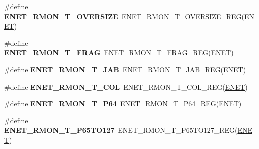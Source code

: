\begin{DoxyCompactItemize}
\item 
\#define {\bfseries E\+N\+E\+T\+\_\+\+R\+M\+O\+N\+\_\+\+T\+\_\+\+O\+V\+E\+R\+S\+I\+ZE}~E\+N\+E\+T\+\_\+\+R\+M\+O\+N\+\_\+\+T\+\_\+\+O\+V\+E\+R\+S\+I\+Z\+E\+\_\+\+R\+EG(\hyperlink{group__ENET__Peripheral__Access__Layer_ga4745105f505f3ab949d6a57fbe2a0ed5}{E\+N\+ET})\hypertarget{group__ENET__Register__Accessor__Macros_ga70b790437654820ef8d2fb4ccd56bac6}{}\label{group__ENET__Register__Accessor__Macros_ga70b790437654820ef8d2fb4ccd56bac6}

\item 
\#define {\bfseries E\+N\+E\+T\+\_\+\+R\+M\+O\+N\+\_\+\+T\+\_\+\+F\+R\+AG}~E\+N\+E\+T\+\_\+\+R\+M\+O\+N\+\_\+\+T\+\_\+\+F\+R\+A\+G\+\_\+\+R\+EG(\hyperlink{group__ENET__Peripheral__Access__Layer_ga4745105f505f3ab949d6a57fbe2a0ed5}{E\+N\+ET})\hypertarget{group__ENET__Register__Accessor__Macros_ga79c1cf9a47efaba14d5ab93b7e760702}{}\label{group__ENET__Register__Accessor__Macros_ga79c1cf9a47efaba14d5ab93b7e760702}

\item 
\#define {\bfseries E\+N\+E\+T\+\_\+\+R\+M\+O\+N\+\_\+\+T\+\_\+\+J\+AB}~E\+N\+E\+T\+\_\+\+R\+M\+O\+N\+\_\+\+T\+\_\+\+J\+A\+B\+\_\+\+R\+EG(\hyperlink{group__ENET__Peripheral__Access__Layer_ga4745105f505f3ab949d6a57fbe2a0ed5}{E\+N\+ET})\hypertarget{group__ENET__Register__Accessor__Macros_gab429b1b2658b8dc8f8900cc50243e7b2}{}\label{group__ENET__Register__Accessor__Macros_gab429b1b2658b8dc8f8900cc50243e7b2}

\item 
\#define {\bfseries E\+N\+E\+T\+\_\+\+R\+M\+O\+N\+\_\+\+T\+\_\+\+C\+OL}~E\+N\+E\+T\+\_\+\+R\+M\+O\+N\+\_\+\+T\+\_\+\+C\+O\+L\+\_\+\+R\+EG(\hyperlink{group__ENET__Peripheral__Access__Layer_ga4745105f505f3ab949d6a57fbe2a0ed5}{E\+N\+ET})\hypertarget{group__ENET__Register__Accessor__Macros_ga4e024726e7b145f433759bf4e343bead}{}\label{group__ENET__Register__Accessor__Macros_ga4e024726e7b145f433759bf4e343bead}

\item 
\#define {\bfseries E\+N\+E\+T\+\_\+\+R\+M\+O\+N\+\_\+\+T\+\_\+\+P64}~E\+N\+E\+T\+\_\+\+R\+M\+O\+N\+\_\+\+T\+\_\+\+P64\+\_\+\+R\+EG(\hyperlink{group__ENET__Peripheral__Access__Layer_ga4745105f505f3ab949d6a57fbe2a0ed5}{E\+N\+ET})\hypertarget{group__ENET__Register__Accessor__Macros_ga55f52465e75b039a863770db93c2fddd}{}\label{group__ENET__Register__Accessor__Macros_ga55f52465e75b039a863770db93c2fddd}

\item 
\#define {\bfseries E\+N\+E\+T\+\_\+\+R\+M\+O\+N\+\_\+\+T\+\_\+\+P65\+T\+O127}~E\+N\+E\+T\+\_\+\+R\+M\+O\+N\+\_\+\+T\+\_\+\+P65\+T\+O127\+\_\+\+R\+EG(\hyperlink{group__ENET__Peripheral__Access__Layer_ga4745105f505f3ab949d6a57fbe2a0ed5}{E\+N\+ET})\hypertarget{group__ENET__Register__Accessor__Macros_ga76588cb610a5268fb112b219d3756934}{}\label{group__ENET__Register__Accessor__Macros_ga76588cb610a5268fb112b219d3756934}


\end{DoxyCompactItemize}
